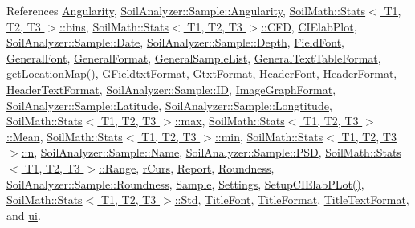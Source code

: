 References \hyperlink{qreportgenerator_8h_source_l00035}{Angularity}, \hyperlink{sample_8h_source_l00045}{Soil\+Analyzer\+::\+Sample\+::\+Angularity}, \hyperlink{_stats_8h_source_l00044}{Soil\+Math\+::\+Stats$<$ T1, T2, T3 $>$\+::bins}, \hyperlink{_stats_8h_source_l00045}{Soil\+Math\+::\+Stats$<$ T1, T2, T3 $>$\+::\+C\+F\+D}, \hyperlink{qreportgenerator_8h_source_l00049}{C\+I\+Elab\+Plot}, \hyperlink{sample_8h_source_l00037}{Soil\+Analyzer\+::\+Sample\+::\+Date}, \hyperlink{sample_8h_source_l00036}{Soil\+Analyzer\+::\+Sample\+::\+Depth}, \hyperlink{qreportgenerator_8h_source_l00076}{Field\+Font}, \hyperlink{qreportgenerator_8h_source_l00075}{General\+Font}, \hyperlink{qreportgenerator_8h_source_l00061}{General\+Format}, \hyperlink{qreportgenerator_8h_source_l00069}{General\+Sample\+List}, \hyperlink{qreportgenerator_8h_source_l00070}{General\+Text\+Table\+Format}, \hyperlink{qreportgenerator_8cpp_source_l00357}{get\+Location\+Map()}, \hyperlink{qreportgenerator_8h_source_l00067}{G\+Fieldtxt\+Format}, \hyperlink{qreportgenerator_8h_source_l00066}{Gtxt\+Format}, \hyperlink{qreportgenerator_8h_source_l00074}{Header\+Font}, \hyperlink{qreportgenerator_8h_source_l00060}{Header\+Format}, \hyperlink{qreportgenerator_8h_source_l00065}{Header\+Text\+Format}, \hyperlink{sample_8h_source_l00032}{Soil\+Analyzer\+::\+Sample\+::\+I\+D}, \hyperlink{qreportgenerator_8h_source_l00062}{Image\+Graph\+Format}, \hyperlink{sample_8h_source_l00035}{Soil\+Analyzer\+::\+Sample\+::\+Latitude}, \hyperlink{sample_8h_source_l00034}{Soil\+Analyzer\+::\+Sample\+::\+Longtitude}, \hyperlink{_stats_8h_source_l00052}{Soil\+Math\+::\+Stats$<$ T1, T2, T3 $>$\+::max}, \hyperlink{_stats_8h_source_l00047}{Soil\+Math\+::\+Stats$<$ T1, T2, T3 $>$\+::\+Mean}, \hyperlink{_stats_8h_source_l00051}{Soil\+Math\+::\+Stats$<$ T1, T2, T3 $>$\+::min}, \hyperlink{_stats_8h_source_l00048}{Soil\+Math\+::\+Stats$<$ T1, T2, T3 $>$\+::n}, \hyperlink{sample_8h_source_l00038}{Soil\+Analyzer\+::\+Sample\+::\+Name}, \hyperlink{sample_8h_source_l00043}{Soil\+Analyzer\+::\+Sample\+::\+P\+S\+D}, \hyperlink{_stats_8h_source_l00050}{Soil\+Math\+::\+Stats$<$ T1, T2, T3 $>$\+::\+Range}, \hyperlink{qreportgenerator_8h_source_l00056}{r\+Curs}, \hyperlink{qreportgenerator_8h_source_l00030}{Report}, \hyperlink{qreportgenerator_8h_source_l00034}{Roundness}, \hyperlink{sample_8h_source_l00044}{Soil\+Analyzer\+::\+Sample\+::\+Roundness}, \hyperlink{qreportgenerator_8h_source_l00031}{Sample}, \hyperlink{qreportgenerator_8h_source_l00032}{Settings}, \hyperlink{qreportgenerator_8cpp_source_l00431}{Setup\+C\+I\+Elab\+P\+Lot()}, \hyperlink{_stats_8h_source_l00056}{Soil\+Math\+::\+Stats$<$ T1, T2, T3 $>$\+::\+Std}, \hyperlink{qreportgenerator_8h_source_l00073}{Title\+Font}, \hyperlink{qreportgenerator_8h_source_l00059}{Title\+Format}, \hyperlink{qreportgenerator_8h_source_l00064}{Title\+Text\+Format}, and \hyperlink{qreportgenerator_8h_source_l00048}{ui}.



